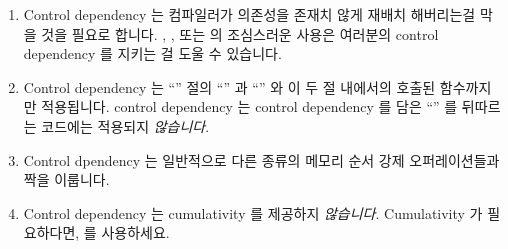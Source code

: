 \begin{enumerate}
\item	Control dependency 는 컴파일러가 의존성을 존재치 않게 재배치 해버리는걸
	막을 것을 필요로 합니다.
	, , 또는  의
	조심스러운 사용은 여러분의 control dependency 를 지키는 걸 도울 수
	있습니다.

\item	Control dependency 는 ``'' 절의 ``'' 과 ``''
	와 이 두 절 내에서의 호출된 함수까지만 적용됩니다.
	control dependency 는 control dependency 를 담은 ``'' 를
	뒤따르는 코드에는 적용되지 \emph{않습니다}.

\item	Control dpendency 는 일반적으로 다른 종류의 메모리 순서 강제
	오퍼레이션들과 짝을 이룹니다.

\item	Control dependency 는 cumulativity 를 제공하지 \emph{않습니다}.
	Cumulativity 가 필요하다면,  를 사용하세요.

\end{enumerate}

